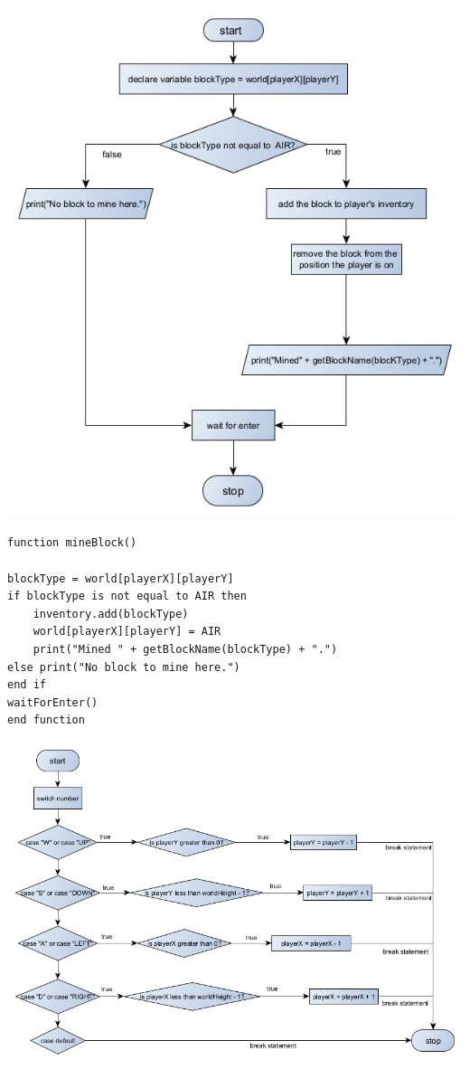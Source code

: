 {\includegraphics[width=\textwidth]{../flowchart/mineBlock.png}}
\begin{lstlisting}
function mineBlock()

blockType = world[playerX][playerY]
if blockType is not equal to AIR then 
	inventory.add(blockType)
	world[playerX][playerY] = AIR
	print("Mined " + getBlockName(blockType) + ".")
else print("No block to mine here.")
end if
waitForEnter()
end function
\end{lstlisting}
\newpage
{\includegraphics[width=\textwidth]{../flowchart/movePlayer.png}}
